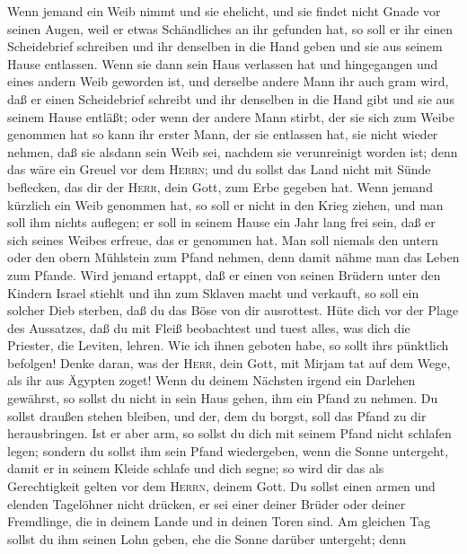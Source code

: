  Wenn jemand ein Weib nimmt und sie ehelicht, und sie
findet nicht Gnade vor seinen Augen, weil er etwas Schändliches an ihr
gefunden hat, so soll er ihr einen Scheidebrief schreiben und ihr
denselben in die Hand geben und sie aus seinem Hause entlassen.
 Wenn sie dann sein Haus verlassen hat und hingegangen und
eines andern Weib geworden ist,  und derselbe andere Mann
ihr auch gram wird, daß er einen Scheidebrief schreibt und ihr denselben
in die Hand gibt und sie aus seinem Hause entläßt; oder wenn der andere
Mann stirbt, der sie sich zum Weibe genommen hat  so kann
ihr erster Mann, der sie entlassen hat, sie nicht wieder nehmen, daß sie
alsdann sein Weib sei, nachdem sie verunreinigt worden ist; denn das
wäre ein Greuel vor dem \textsc{Herrn}; und du sollst das Land nicht mit
Sünde beflecken, das dir der \textsc{Herr}, dein Gott, zum Erbe gegeben
hat.  Wenn jemand kürzlich ein Weib genommen hat, so soll
er nicht in den Krieg ziehen, und man soll ihm nichts auflegen; er soll
in seinem Hause ein Jahr lang frei sein, daß er sich seines Weibes
erfreue, das er genommen hat.  Man soll niemals den untern
oder den obern Mühlstein zum Pfand nehmen, denn damit nähme man das
Leben zum Pfande.  Wird jemand ertappt, daß er einen von
seinen Brüdern unter den Kindern Israel stiehlt und ihn zum Sklaven
macht und verkauft, so soll ein solcher Dieb sterben, daß du das Böse
von dir ausrottest.  Hüte dich vor der Plage des
Aussatzes, daß du mit Fleiß beobachtest und tuest alles, was dich die
Priester, die Leviten, lehren. Wie ich ihnen geboten habe, so sollt
ihr\textquotesingle s pünktlich befolgen!  Denke daran,
was der \textsc{Herr}, dein Gott, mit Mirjam tat auf dem Wege, als ihr
aus Ägypten zoget!  Wenn du deinem Nächsten irgend ein
Darlehen gewährst, so sollst du nicht in sein Haus gehen, ihm ein Pfand
zu nehmen.  Du sollst draußen stehen bleiben, und der,
dem du borgst, soll das Pfand zu dir herausbringen.  Ist
er aber arm, so sollst du dich mit seinem Pfand nicht schlafen legen;
 sondern du sollst ihm sein Pfand wiedergeben, wenn die
Sonne untergeht, damit er in seinem Kleide schlafe und dich segne; so
wird dir das als Gerechtigkeit gelten vor dem \textsc{Herrn}, deinem
Gott.  Du sollst einen armen und elenden Tagelöhner nicht
drücken, er sei einer deiner Brüder oder deiner Fremdlinge, die in
deinem Lande und in deinen Toren sind.  Am gleichen Tag
sollst du ihm seinen Lohn geben, ehe die Sonne darüber untergeht; denn
